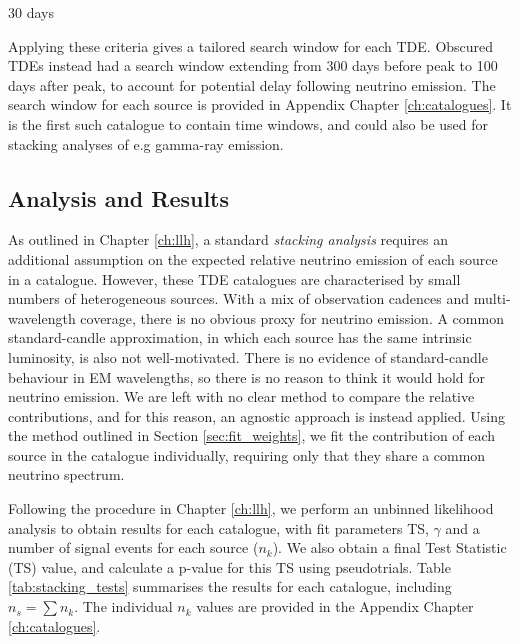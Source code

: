 30 days

Applying these criteria gives a tailored search window for each TDE. Obscured TDEs instead had a search window extending from 300 days before peak to 100 days after peak, to account for potential delay following neutrino emission. The search window for each source is provided in Appendix Chapter \ref{ch:catalogues}. It is the first such catalogue to contain time windows, and could also be used for stacking analyses of e.g gamma-ray emission.

\subsection{Analysis and Results}

As outlined in Chapter \ref{ch:llh}, a standard \emph{stacking analysis} requires an additional assumption on the expected relative neutrino emission of each source in a catalogue. However, these TDE catalogues are characterised by small numbers of heterogeneous sources. With a mix of observation cadences and multi-wavelength coverage, there is no obvious proxy for neutrino emission. A common standard-candle approximation, in which each source has the same intrinsic luminosity, is also not well-motivated. There is no evidence of standard-candle behaviour in EM wavelengths, so there is no reason to think it would hold for neutrino emission. We are left with no clear method to compare the relative contributions, and for this reason, an agnostic approach is instead applied. Using the method outlined in Section \ref{sec:fit_weights}, we fit the contribution of each source in the catalogue individually, requiring only that they share a common neutrino spectrum.

Following the procedure in Chapter \ref{ch:llh}, we perform an unbinned likelihood analysis to obtain results for each catalogue, with fit parameters TS, $\gamma$ and a number of signal events for each source ($n_{k}$). We also obtain a final Test Statistic (TS) value, and calculate a p-value for this TS using pseudotrials. Table \ref{tab:stacking_tests} summarises the results for each catalogue, including $n_{s} = \sum n_{k}$. The individual $n_{k}$ values are provided in the Appendix Chapter \ref{ch:catalogues}.


